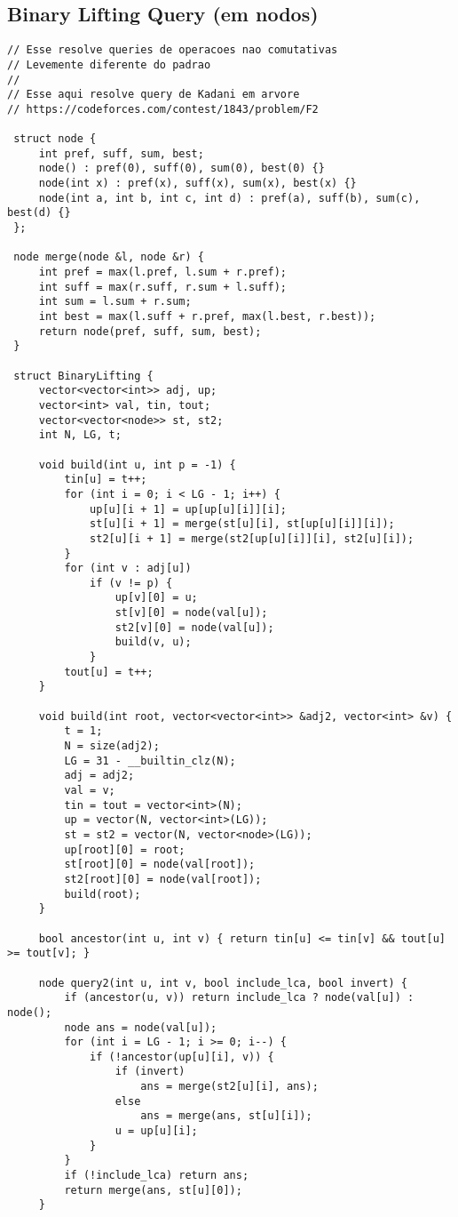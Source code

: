 \documentclass[11pt, a4paper, twoside]{article}
\begin{document}
\subsection{Binary Lifting Query (em nodos)}
\begin{lstlisting}
// Esse resolve queries de operacoes nao comutativas
// Levemente diferente do padrao
//
// Esse aqui resolve query de Kadani em arvore
// https://codeforces.com/contest/1843/problem/F2

 struct node {
     int pref, suff, sum, best;
     node() : pref(0), suff(0), sum(0), best(0) {}
     node(int x) : pref(x), suff(x), sum(x), best(x) {}
     node(int a, int b, int c, int d) : pref(a), suff(b), sum(c), best(d) {}
 };
 
 node merge(node &l, node &r) {
     int pref = max(l.pref, l.sum + r.pref);
     int suff = max(r.suff, r.sum + l.suff);
     int sum = l.sum + r.sum;
     int best = max(l.suff + r.pref, max(l.best, r.best));
     return node(pref, suff, sum, best);
 }
 
 struct BinaryLifting {
     vector<vector<int>> adj, up;
     vector<int> val, tin, tout;
     vector<vector<node>> st, st2;
     int N, LG, t;
 
     void build(int u, int p = -1) {
         tin[u] = t++;
         for (int i = 0; i < LG - 1; i++) {
             up[u][i + 1] = up[up[u][i]][i];
             st[u][i + 1] = merge(st[u][i], st[up[u][i]][i]);
             st2[u][i + 1] = merge(st2[up[u][i]][i], st2[u][i]);
         }
         for (int v : adj[u])
             if (v != p) {
                 up[v][0] = u;
                 st[v][0] = node(val[u]);
                 st2[v][0] = node(val[u]);
                 build(v, u);
             }
         tout[u] = t++;
     }
 
     void build(int root, vector<vector<int>> &adj2, vector<int> &v) {
         t = 1;
         N = size(adj2);
         LG = 31 - __builtin_clz(N);
         adj = adj2;
         val = v;
         tin = tout = vector<int>(N);
         up = vector(N, vector<int>(LG));
         st = st2 = vector(N, vector<node>(LG));
         up[root][0] = root;
         st[root][0] = node(val[root]);
         st2[root][0] = node(val[root]);
         build(root);
     }
 
     bool ancestor(int u, int v) { return tin[u] <= tin[v] && tout[u] >= tout[v]; }
 
     node query2(int u, int v, bool include_lca, bool invert) {
         if (ancestor(u, v)) return include_lca ? node(val[u]) : node();
         node ans = node(val[u]);
         for (int i = LG - 1; i >= 0; i--) {
             if (!ancestor(up[u][i], v)) {
                 if (invert)
                     ans = merge(st2[u][i], ans);
                 else
                     ans = merge(ans, st[u][i]);
                 u = up[u][i];
             }
         }
         if (!include_lca) return ans;
         return merge(ans, st[u][0]);
     }
 

\end{lstlisting}
\end{document}
